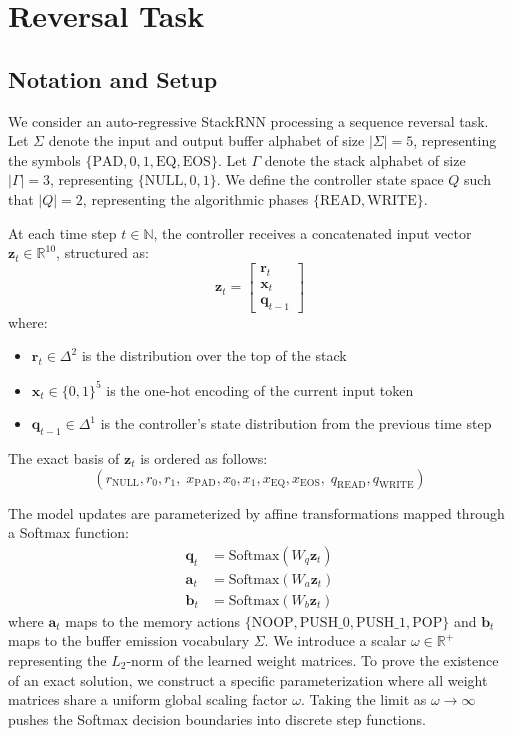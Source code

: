 \documentclass[11pt]{article}
\newcommand{\bm}{\mathbf}
\begin{document}
\section{Reversal Task}

\subsection*{Notation and Setup}

We consider an auto-regressive StackRNN processing a sequence reversal task. Let $\Sigma$ denote the input and output buffer alphabet of size $|\Sigma| = 5$, representing the symbols $\{\text{PAD}, 0, 1, \text{EQ}, \text{EOS}\}$. Let $\Gamma$ denote the stack alphabet of size $|\Gamma| = 3$, representing $\{\text{NULL}, 0, 1\}$. We define the controller state space $Q$ such that $|Q| = 2$, representing the algorithmic phases $\{\text{READ}, \text{WRITE}\}$. 

At each time step $t \in \mathbb{N}$, the controller receives a concatenated input vector $\bm{z}_t \in \mathbb{R}^{10}$, structured as:
\begin{equation}
\bm{z}_t = \begin{bmatrix} \bm{r}_t \\ \bm{x}_t \\ \bm{q}_{t-1} \end{bmatrix}
\end{equation}
where:
\begin{itemize}
    \item $\bm{r}_t \in \Delta^2$ is the distribution over the top of the stack
    \item $\bm{x}_t \in \{0, 1\}^5$ is the one-hot encoding of the current input token
    \item $\bm{q}_{t-1} \in \Delta^1$ is the controller's state distribution from the previous time step
\end{itemize}

The exact basis of $\bm{z}_t$ is ordered as follows:
\begin{equation}
(r_{\text{NULL}}, r_0, r_1, \; x_{\text{PAD}}, x_0, x_1, x_{\text{EQ}}, x_{\text{EOS}}, \; q_{\text{READ}}, q_{\text{WRITE}})
\end{equation}

The model updates are parameterized by affine transformations mapped through a Softmax function:
\begin{align}
    \bm{q}_t &= \text{Softmax}(W_q \bm{z}_t) \\
    \bm{a}_t &= \text{Softmax}(W_a \bm{z}_t) \\
    \bm{b}_t &= \text{Softmax}(W_b \bm{z}_t)
\end{align}
where $\bm{a}_t$ maps to the memory actions $\{\text{NOOP}, \text{PUSH\_0}, \text{PUSH\_1}, \text{POP}\}$ and $\bm{b}_t$ maps to the buffer emission vocabulary $\Sigma$. We introduce a scalar $\omega \in \mathbb{R}^+$ representing the $L_2$-norm of the learned weight matrices. To prove the existence of an exact solution, we construct a specific parameterization where all weight matrices share a uniform global scaling factor $\omega$. Taking the limit as $\omega \to \infty$ pushes the Softmax decision boundaries into discrete step functions.
\end{document}
